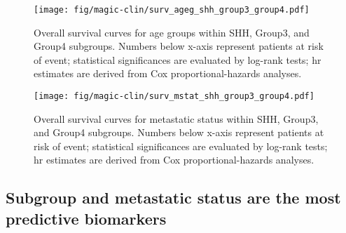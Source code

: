 \bigskip

\begin{figure}[ht]
	\begin{center}
		\texttt{[image: fig/magic-clin/surv\_ageg\_shh\_group3\_group4.pdf]}
	\end{center}
	\caption[Overall survival curves for age groups within SHH, Group3, and Group4 subgroups]
	{
	Overall survival curves for age groups within SHH, Group3, and Group4 subgroups.
	Numbers below x-axis represent patients at risk of event; statistical significances are evaluated by log-rank tests; \gls{hr} estimates are derived from Cox proportional-hazards analyses.
	}
	\label{fig:surv_ageg_shh_group3_group4}
\end{figure}

\begin{figure}[ht]
	\begin{center}
		\texttt{[image: fig/magic-clin/surv\_mstat\_shh\_group3\_group4.pdf]}
	\end{center}
	\caption[Overall survival curves for metastatic status within SHH, Group3, and Group4 subgroups]
	{
	Overall survival curves for metastatic status within SHH, Group3, and Group4 subgroups.
	Numbers below x-axis represent patients at risk of event; statistical significances are evaluated by log-rank tests; \gls{hr} estimates are derived from Cox proportional-hazards analyses.
	}
	\label{fig:surv_mstat_shh_group3_group4}
\end{figure}

\clearpage

\subsection{Subgroup and metastatic status are the most predictive biomarkers}

